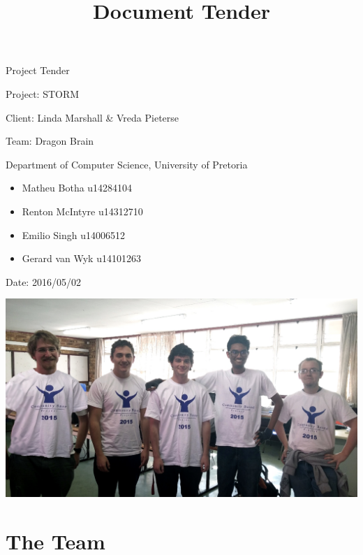 \documentclass[12pt]{article}
\begin{document}
\title{Document Tender}

\begin{titlepage}
\begin{huge}
\begin{center}
Project Tender

Project: STORM
\\
\begin{LARGE}
Client: Linda Marshall \& Vreda Pieterse
\end{LARGE}

Team: Dragon Brain
\\
\begin{small}
Department of Computer Science, University of Pretoria
\\
\begin{itemize}
\item Matheu Botha u14284104
\item Renton McIntyre u14312710
\item Emilio Singh u14006512
\item Gerard van Wyk u14101263
\end{itemize}


Date: 2016/05/02

\end{small}

\includegraphics[scale=0.2]{JCPfinalPoseLowres}
\end{center}

\end{huge}


\end{titlepage}

\pagebreak

\section{The Team}
\end{document}
